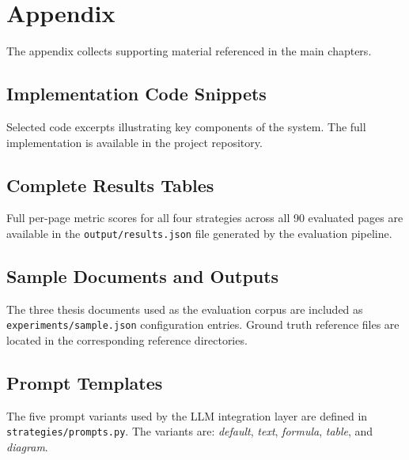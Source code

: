 \chapter{Appendix}

The appendix collects supporting material referenced in the main chapters.

\section{Implementation Code Snippets}

Selected code excerpts illustrating key components of the system. The full
implementation is available in the project repository.

\section{Complete Results Tables}

Full per-page metric scores for all four strategies across all 90 evaluated
pages are available in the \texttt{output/results.json} file generated by the
evaluation pipeline.

\section{Sample Documents and Outputs}

The three thesis documents used as the evaluation corpus are included as
\texttt{experiments/sample.json} configuration entries. Ground truth reference
files are located in the corresponding reference directories.

\section{Prompt Templates}

The five prompt variants used by the LLM integration layer are defined in
\texttt{strategies/prompts.py}. The variants are: \textit{default},
\textit{text}, \textit{formula}, \textit{table}, and \textit{diagram}.
